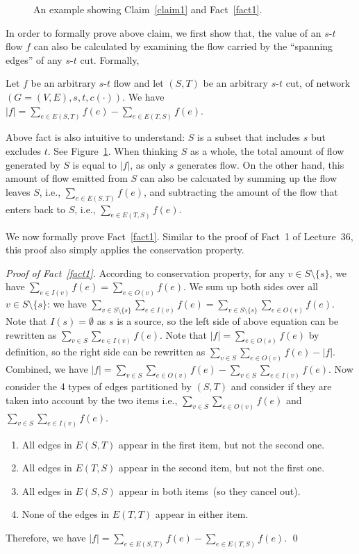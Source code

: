 \begin{figure}[h]
\centering{}
\caption{An example showing Claim~\ref{claim1} and Fact~\ref{fact1}.}
\label{fig:claim}
\end{figure}


In order to formally prove above claim, we first show that, the value of an $s$-$t$ flow $f$
can also be calculated by examining the flow carried by the ``spanning edges'' of any $s$-$t$ cut.
Formally,
\begin{fact} \label{fact1}
Let $f$ be an arbitrary $s$-$t$ flow and let $(S, T)$ be an arbitrary $s$-$t$ cut, of network $(G=(V, E), s, t, c(\cdot))$.
We have $|f| = \sum_{e\in E(S, T)} f(e) - \sum_{e\in E(T, S)} f(e)$.
\end{fact}

Above fact is also intuitive to understand: $S$ is a subset that includes $s$ but excludes $t$.
See Figure~\ref{fig:claim}.
When thinking $S$ as a whole, 
the total amount of flow generated by $S$ is equal to $|f|$, as only $s$ generates flow.
On the other hand, this amount of flow emitted from $S$ 
can also be calcuated by summing up the flow leaves $S$, i.e., $\sum_{e\in E(S, T)} f(e)$,
and subtracting the amount of the flow that enters back to $S$, i.e., $\sum_{e\in E(T, S)} f(e)$.

We now formally prove Fact~\ref{fact1}. 
Similar to the proof of Fact~1 of Lecture~36, this proof also simply applies the conservation property.

\emph{Proof of Fact~\ref{fact1}.} According to conservation property, for any $v\in S\setminus \{s\}$,
we have $\sum_{e\in I(v)} f(e) = \sum_{e\in O(v)} f(e)$. 
We sum up both sides over all $v\in S\setminus\{s\}$: 
we have $\sum_{v\in S\setminus\{s\}} \sum_{e\in I(v)} f(e) = \sum_{v\in S\setminus\{s\}} \sum_{e\in O(v)} f(e)$. 
Note that $I(s) = \emptyset$ as $s$ is a source, so the left side of above equation can be rewritten as $\sum_{v\in S} \sum_{e\in I(v)} f(e)$.
Note that $|f| = \sum_{e\in O(s)} f(e)$ by definition, so the right side can be rewritten as $\sum_{v\in S} \sum_{e\in O(v)} f(e) - |f|$.
Combined, we have $|f| = \sum_{v\in S} \sum_{e\in O(v)} f(e) - \sum_{v\in S} \sum_{e\in I(v)} f(e)$. 
Now consider the 4 types of edges partitioned by $(S, T)$ and consider if they are taken into account by the two items
i.e., $\sum_{v\in S} \sum_{e\in O(v)} f(e)$ and $\sum_{v\in S} \sum_{e\in I(v)} f(e)$. 
\vspace*{-\topsep}
\begin{enumerate}
\item All edges in $E(S, T)$ appear in the first item, but not the second one.
\item All edges in $E(T, S)$ appear in the second item, but not the first one.
\item All edges in $E(S, S)$ appear in both items~(so they cancel out).
\item None of the edges in $E(T, T)$ appear in either item.
\end{enumerate}
Therefore, we have $|f| = \sum_{e\in E(S, T)} f(e) - \sum_{e\in E(T, S)} f(e)$. \qed

